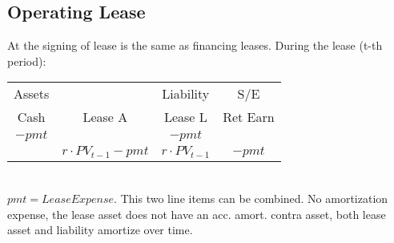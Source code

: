 \subsection*{Operating Lease} 
At the signing of lease is the same as financing leases. During the lease (t-th period): \\
\begin{tabular}{ |c|c||c|c| } 
	\hline
	Assets  & & Liability  & S/E \\ 
	Cash & Lease A  & Lease L & Ret Earn  \\ 
	\hline
	$-pmt$ &    & $-pmt$ &   \\
	\hline
           & $r \cdot PV_{t-1} -pmt$ & $r \cdot PV_{t-1}$      & $-pmt$  \\
	\hline
\end{tabular} \\
$pmt = LeaseExpense$. This two line items can be combined.
No amortization expense, the lease asset does not have an acc. amort. contra asset, both lease asset and liability amortize over time.


